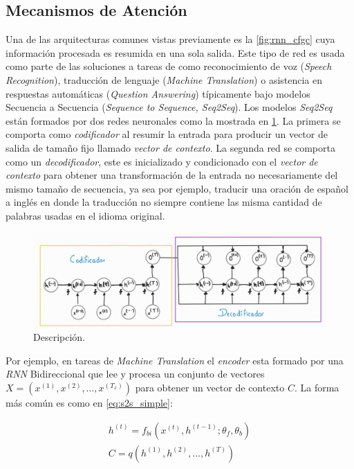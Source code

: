 \subsection{Mecanismos de Atención}

Una de las arquitecturas comunes vistas previamente es la \ref{fig:rnn_cfgc} cuya información
procesada es resumida en una sola salida. Este tipo de red es usada como parte de las soluciones a
tareas de como reconocimiento de voz (\textit{Speech Recognition}), traducción de lenguaje
(\textit{Machine Translation}) o asistencia en respuestas automáticas (\textit{Question Answering})
típicamente bajo modelos Secuencia a Secuencia (\textit{Sequence to Sequence, Seq2Seq}). Los modelos
\textit{Seq2Seq} están formados por dos redes neuronales como la mostrada en \ref{fig:seq2seq}. La
primera se comporta como \textit{codificador} al resumir la entrada para producir un vector de salida
de tamaño fijo llamado \textit{vector de contexto}. La segunda red se comporta como un
\textit{decodificador}, este es inicializado y condicionado con el
\textit{vector de contexto} para obtener una transformación de la entrada no necesariamente del
mismo tamaño de secuencia, ya sea por ejemplo, traducir una oración de español a inglés en donde la
traducción no siempre contiene las misma cantidad de palabras usadas en el idioma original.

\begin{figure}[ht!]
    \centering
    \includegraphics[width=1.0 \textwidth]{Chapters/1. Transformer/Figures/rnn/seq2seq.jpg}
    \caption{Descripción.}
    \label{fig:seq2seq}
\end{figure}

Por ejemplo, en tareas de \textit{Machine Translation} el \textit{encoder} esta formado por una
\textit{RNN} Bidireccional que lee y procesa un conjunto de
vectores $X = (x^{(1)}, x^{(2)}, \dots, x^{(T_x)})$ para obtener un vector de contexto $C$. La forma
más común es como en \ref{eq:s2s_simple}:

\begin{equation}
    \begin{split}
        h^{(t)} = f_{bi}(x^{(t)}, h^{(t-1)}; \theta_{f}, \theta_{b}) \\
        C = q({h^{(1)}, h^{(2)}, \dots, h^{(T)}})
    \end{split}
    \label{eq:s2s_simple}
\end{equation}

